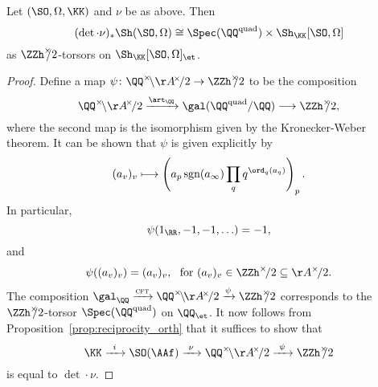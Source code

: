 \begin{proposition}\label{prop:reciprocity_orth_special}
    Let $(\SO,\Omega,{\KK})$ and $\nu$ be as above. Then
$$
    (\det \cdot \nu)_*\Sh(\SO,\Omega) \cong \Spec(\QQ^{\textnormal{quad}}) \times \Sh_{\KK}[\SO,\Omega]
$$
    as $\ZZh^{\times}\hspace{-5pt}/2$-torsors on $\Sh_{\KK}[\SO,\Omega]_{\et}$.
\end{proposition}
\begin{proof}
Define a map $\psi\colon \QQ^{\times}\!\backslash\AA^{\!\times}\!/2 \rightarrow \ZZh^{\times}\hspace{-5pt}/2$ to be the composition
$$
\QQ^{\times}\!\backslash\AA^{\!\times}\!/2  \xrightarrow{\art_{\QQ}} \gal(\QQ^{\text{quad}}/\QQ) \longrightarrow \ZZh^{\times}\hspace{-5pt}/2,
$$
where the second map is the isomorphism given by the Kronecker-Weber theorem. It can be shown that $\psi$ is given explicitly by
$$
(a_v)_v \longmapsto \left( a_p \, \text{sgn}(a_{\infty}) \prod_q q^{\ord_q(a_q)} \right)_p.
$$
In particular, 
    \begin{equation}\label{eq:psi_identity_one}
        \psi(1_{\RR},-1,-1,\ldots) = -1,
\end{equation}
and 
\begin{equation}\label{eq:psi_identity_two}
    \psi((a_v)_v) = (a_v)_v, \ \text{ for } (a_v)_v \in \ZZh^{\times}\!/2 \subseteq \AA^{\times}\!/2.
\end{equation}
The composition $\gal_{\QQ} \xrightarrow{\textsc{cft}} \QQ^{\times}\!\backslash\!\AA^{\!\times}\!/2 \xrightarrow{\psi} \ZZh^{\times}\hspace{-5pt}/2$ corresponds to the $\ZZh^{\times}\hspace{-5pt}/2$-torsor $\Spec(\QQ^{\text{quad}})$ on $\QQ_{\et}$. It now follows from Proposition~\ref{prop:reciprocity_orth} that it suffices to show that 
$$
    {\KK} \xrightarrow{\ \, i \, \ } \SO(\AAf) \xrightarrow{ \ \nu \ } \QQ^{\times}\!\backslash\AA^{\!\times}\!/2 \xrightarrow{\ \psi \ } \ZZh^{\times}\hspace{-5pt}/2
$$
is equal to $\det \cdot \nu$. 


\end{proof}
